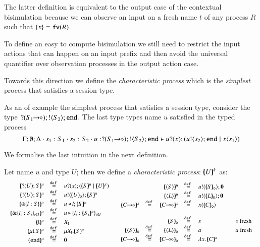 The latter definition is equivalent to the output
case of the contextual bisimulation
because we can observe an input on a fresh name $t$
of any process $R$ such that $\{x\} = \mathtt{fv}(R)$.

To define an easy to compute bisimulation we still need to
restrict the input actions that can happen on an input
prefix and then avoid the universal quantifier over 
observation processes in the output action case.

Towards this direction we define the {\em characteristic
process} which is the {\em simplest} process that
satisfies a session type.

As an of example the simplest process that satisfies a
session type, consider the type
$? (S_1\!\! \rightarrow\!\! \diamond) ; ! \langle S_2 \rangle ; \mathtt{end}$. The last type
types name $u$ satisfied in the typed process
\[
	\Gamma; \emptyset; \Delta \cdot s_1: S_1 \cdot s_2: S_2 \cdot u: ? (S_1\!\! \rightarrow\!\! \diamond) ; ! \langle S_2 \rangle ; \mathtt{end} \vdash u ? (x) ; (u ! \langle s_2 \rangle ; \mathtt{end} \;|\; x\langle s_1 \rangle)
\]

We formalise the last intuition in the next definition.
%
\begin{definition}\rm
	\label{def:characteristic_process}
	\noi Let name $u$ and type $U$; then we define a {\em characteristic process}:
	$[\!\!(U)\!\!]^{k}$ as:
%
	\[
	\begin{array}{cc}
		\begin{array}{rclcl}
			\mapchar{\btinp{U} S}{u} &\defeq& \binp{u}{x} (\mapchar{S}{u} \Par \mapchar{U}{x})
			\\
			\mapchar{\btout{U} S}{u} &\defeq& \bout{u}{\omapchar{U}} \mapchar{S}{u} %
			\\
			\mapchar{\btsel{l : S}}{u} &\defeq& \bsel{u}{l} \mapchar{S}{u}
			\\
			\mapchar{\btbra{l_i: S_i}_{i \in I}}{u} &\defeq& \bbra{u}{l_i: \mapchar{S_i}{u}}_{i \in I}
			\\
			\mapchar{\tvar{t}}{u} &\defeq& \varp{X}_{\vart{t}}
			\\
			\mapchar{\trec{t}{S}}{u} &\defeq& \recp{X_{\vart{t}}}{\mapchar{S}{u}}
			\\
			\mapchar{\tinact}{u} &\defeq& \inact
			\\
		\end{array}
		&
		\begin{array}{rcrclcl}
			&&\mapchar{\chtype{S}}{u} &\defeq& \bout{u}{\omapchar{S}} \inact
			\\
			&&\mapchar{\chtype{L}}{u} &\defeq& \bout{u}{\omapchar{L}} \inact
			\\
			\mapchar{\shot{C}}{x} &\defeq& \mapchar{\lhot{C}}{x} &\defeq& \appl{x}{\omapchar{C}}
			\\
			\\
			&&\omapchar{S} &\defeq& s && s \textrm{ fresh}
			\\
			\omapchar{\chtype{S}} &\defeq& \omapchar{\chtype{L}} &\defeq& a && a \textrm{ fresh}
			\\
			\omapchar{\shot{C}} &\defeq& \omapchar{\lhot{C}} &\defeq& \abs{x}{\mapchar{C}{x}}
		\end{array}
	\end{array}
	\]
\end{definition}

